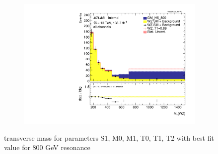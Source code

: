 \documentclass[../Bachelorarbeit.tex]{subfiles}
\begin{document}
\begin{figure}
\begin{subfigure}{0.3\textwidth}
    \end{subfigure}
    \begin{subfigure}{0.3\textwidth}
        \includegraphics[width=\textwidth]{Plots/ALL_MTWZ_final/GM_H5_800/T1/2022-04-21/VBSSR/all_VV_MTWZ.pdf}
    \end{subfigure}

    \caption{transverse mass for parameters S1, M0, M1, T0, T1, T2 with best fit value for 800 GeV resonance}
    \label{fig:all_mtwz_800}
\end{figure}
\end{document}
